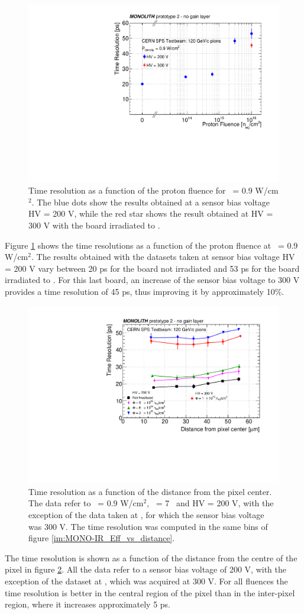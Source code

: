 		\begin{figure}[h]
			\centering
			\includegraphics[width=.67\textwidth]{files/MONOLITH_Irradiated_paper/Fluence_log_timeresolution.pdf}
			\caption{Time resolution as a function of the proton fluence for \power~= 0.9 W/cm$^2$. The blue dots show the results obtained at a sensor bias voltage HV = 200 V, while the red star shows the result obtained at HV = 300 V with the board irradiated to \maxflu.}
			\label{im:MONO-IR_fluence_vs_timeres} 
		\end{figure}

		Figure \ref{im:MONO-IR_fluence_vs_timeres} shows the time resolutions as a function of the proton fluence at \power~= 0.9 W/cm$^2$. The results obtained with the datasets taken at sensor bias voltage HV = 200 V vary between 20 ps for the board not irradiated and 53 ps for the board irradiated to \maxflu. 
		For this last board, an increase of the sensor bias voltage to 300 V provides a time resolution of 45 ps, thus improving it by approximately 10\%.

		\begin{figure}[!htb]
			\centering
			\includegraphics[width=.67\textwidth]{files/MONOLITH_Irradiated_paper/Radius_timeresolution}
			\caption{Time resolution as a function of the distance from the pixel center. The data refer to \power~= 0.9 W/cm$^2$,  \vth~= 7 \noise~and HV = 200 V, with the exception of the data taken at \maxflu, for which the sensor bias voltage was 300 V. The time resolution was computed in the same bins of figure \ref{im:MONO-IR_Eff_vs_distance}.}
			\label{im:MONO-IR_Timeres_vs_distance}
		\end{figure}

		The time resolution is shown as a function of the distance from the centre of the pixel in figure \ref{im:MONO-IR_Timeres_vs_distance}.
		All the data refer to a sensor bias voltage of 200 V, with the exception of the dataset at \maxflu, which was acquired at 300 V.
		For all fluences the time resolution is better in the central region of the pixel than in the inter-pixel region, where it increases approximately 5 ps.
		